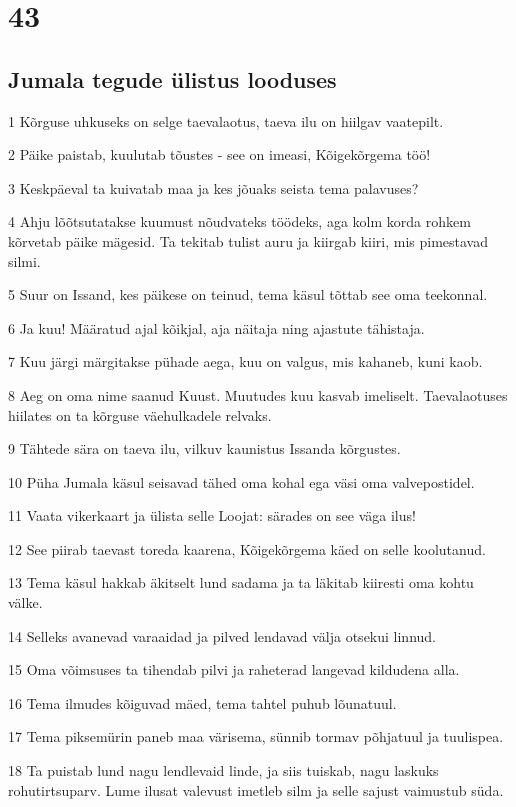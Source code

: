 \chapter{43}

\section*{Jumala tegude ülistus looduses}

\par 1 Kõrguse uhkuseks on selge taevalaotus, taeva ilu on hiilgav vaatepilt.
\par 2 Päike paistab, kuulutab tõustes - see on imeasi, Kõigekõrgema töö!
\par 3 Keskpäeval ta kuivatab maa ja kes jõuaks seista tema palavuses?
\par 4 Ahju lõõtsutatakse kuumust nõudvateks töödeks, aga kolm korda rohkem kõrvetab päike mägesid. Ta tekitab tulist auru ja kiirgab kiiri, mis pimestavad silmi.
\par 5 Suur on Issand, kes päikese on teinud, tema käsul tõttab see oma teekonnal.
\par 6 Ja kuu! Määratud ajal kõikjal, aja näitaja ning ajastute tähistaja.
\par 7 Kuu järgi märgitakse pühade aega, kuu on valgus, mis kahaneb, kuni kaob.
\par 8 Aeg on oma nime saanud Kuust. Muutudes kuu kasvab imeliselt. Taevalaotuses hiilates on ta kõrguse väehulkadele relvaks.
\par 9 Tähtede sära on taeva ilu, vilkuv kaunistus Issanda kõrgustes.
\par 10 Püha Jumala käsul seisavad tähed oma kohal ega väsi oma valvepostidel.
\par 11 Vaata vikerkaart ja ülista selle Loojat: särades on see väga ilus!
\par 12 See piirab taevast toreda kaarena, Kõigekõrgema käed on selle koolutanud.
\par 13 Tema käsul hakkab äkitselt lund sadama ja ta läkitab kiiresti oma kohtu välke.
\par 14 Selleks avanevad varaaidad ja pilved lendavad välja otsekui linnud.
\par 15 Oma võimsuses ta tihendab pilvi ja raheterad langevad kildudena alla.
\par 16 Tema ilmudes kõiguvad mäed, tema tahtel puhub lõunatuul.
\par 17 Tema piksemürin paneb maa värisema, sünnib tormav põhjatuul ja tuulispea.
\par 18 Ta puistab lund nagu lendlevaid linde, ja siis tuiskab, nagu laskuks rohutirtsuparv. Lume ilusat valevust imetleb silm ja selle sajust vaimustub süda.
